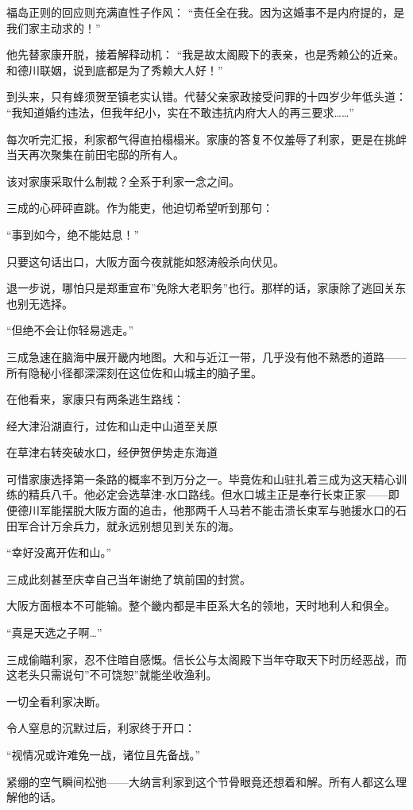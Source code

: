 \documentclass[
]{book}
\begin{document}
福岛正则的回应则充满直性子作风：
``责任全在我。因为这婚事不是内府提的，是我们家主动求的！''

他先替家康开脱，接着解释动机：
``我是故太阁殿下的表亲，也是秀赖公的近亲。和德川联姻，说到底都是为了秀赖大人好！''

到头来，只有蜂须贺至镇老实认错。代替父亲家政接受问罪的十四岁少年低头道：
``我知道婚约违法，但我年纪小，实在不敢违抗内府大人的再三要求\ldots\ldots{}''

每次听完汇报，利家都气得直拍榻榻米。家康的答复不仅羞辱了利家，更是在挑衅当天再次聚集在前田宅邸的所有人。

该对家康采取什么制裁？全系于利家一念之间。

三成的心砰砰直跳。作为能吏，他迫切希望听到那句：

``事到如今，绝不能姑息！''

只要这句话出口，大阪方面今夜就能如怒涛般杀向伏见。

退一步说，哪怕只是郑重宣布''免除大老职务''也行。那样的话，家康除了逃回关东也别无选择。

``但绝不会让你轻易逃走。''

三成急速在脑海中展开畿内地图。大和与近江一带，几乎没有他不熟悉的道路------所有隐秘小径都深深刻在这位佐和山城主的脑子里。

在他看来，家康只有两条逃生路线：

经大津沿湖直行，过佐和山走中山道至关原

在草津右转突破水口，经伊贺伊势走东海道

可惜家康选择第一条路的概率不到万分之一。毕竟佐和山驻扎着三成为这天精心训练的精兵八千。他必定会选草津-水口路线。但水口城主正是奉行长束正家------即便德川军能摆脱大阪方面的追击，他那两千人马若不能击溃长束军与驰援水口的石田军合计万余兵力，就永远别想见到关东的海。

``幸好没离开佐和山。''

三成此刻甚至庆幸自己当年谢绝了筑前国的封赏。

大阪方面根本不可能输。整个畿内都是丰臣系大名的领地，天时地利人和俱全。

``真是天选之子啊\ldots{}''

三成偷瞄利家，忍不住暗自感慨。信长公与太阁殿下当年夺取天下时历经恶战，而这老头只需说句''不可饶恕''就能坐收渔利。

一切全看利家决断。

令人窒息的沉默过后，利家终于开口：

``视情况或许难免一战，诸位且先备战。''

紧绷的空气瞬间松弛------大纳言利家到这个节骨眼竟还想着和解。所有人都这么理解他的话。
\end{document}

